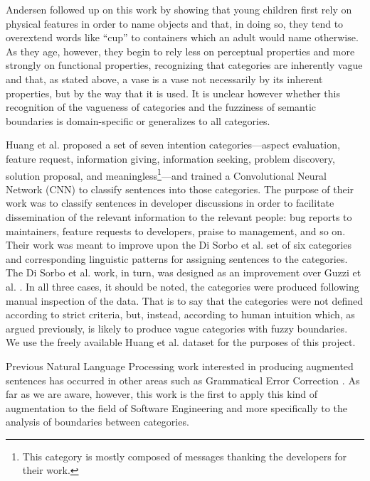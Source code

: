 \documentclass[letterpaper, 12 pt, conference]{ieeeconf}
\begin{document}
Andersen \cite{andersen:cups_and_glasses:1975} followed up on this work by showing that young children first rely on physical features in order to name objects and that, in doing so, they tend to overextend words like ``cup'' to containers which an adult would name otherwise. As they age, however, they begin to rely less on perceptual properties and more strongly on functional properties, recognizing that categories are inherently vague and that, as stated above, a vase is a vase not necessarily by its inherent properties, but by the way that it is used. It is unclear however whether this recognition of the vagueness of categories and the fuzziness of semantic boundaries is domain-specific or generalizes to all categories.

Huang et al. \cite{huang:aim:2018} proposed a set of seven intention categories---aspect evaluation, feature request, information giving, information seeking, problem discovery, solution proposal, and meaningless\footnote{This category is mostly composed of messages thanking the developers for their work.}---and trained a Convolutional Neural Network (CNN) to classify sentences into those categories. The purpose of their work was to classify sentences in developer discussions in order to facilitate dissemination of the relevant information to the relevant people: bug reports to maintainers, feature requests to developers, praise to management, and so on. Their work was meant to improve upon the Di Sorbo et al. \cite{disorbo:deca:2016} set of six categories and corresponding linguistic patterns for assigning sentences to the categories. The Di Sorbo et al. work, in turn, was designed as an improvement over Guzzi et al. \cite{guzzi:communication_in_mailing_lists:2013}. In all three cases, it should be noted, the categories were produced following manual inspection of the data. That is to say that the categories were not defined according to strict criteria, but, instead, according to human intuition which, as argued previously, is likely to produce vague categories with fuzzy boundaries. We use the freely available Huang et al. dataset for the purposes of this project.

Previous Natural Language Processing work interested in producing augmented sentences has occurred in other areas such as Grammatical Error Correction \cite{kiyono:grammar:2019}. As far as we are aware, however, this work is the first to apply this kind of augmentation to the field of Software Engineering and more specifically to the analysis of boundaries between categories.
\end{document}

